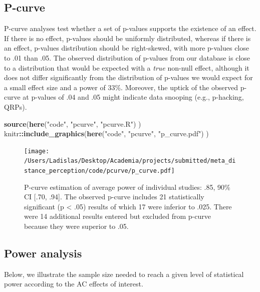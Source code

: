 \documentclass[floatsintext,doc]{apa6}
\newenvironment{Shaded}{\begin{snugshade}}{\end{snugshade}}
\newcommand{\KeywordTok}[1]{\textcolor[rgb]{0.13,0.29,0.53}{\textbf{#1}}}
\newcommand{\NormalTok}[1]{#1}
\newcommand{\OperatorTok}[1]{\textcolor[rgb]{0.81,0.36,0.00}{\textbf{#1}}}
\newcommand{\StringTok}[1]{\textcolor[rgb]{0.31,0.60,0.02}{#1}}
\begin{document}
\hypertarget{p-curve}{%
\subsection{P-curve}\label{p-curve}}

P-curve analyses test whether a set of p-values supports the existence of an effect. If there is no effect, p-values should be uniformly distributed, whereas if there is an effect, p-values distribution should be right-skewed, with more p-values close to .01 than .05. The observed distribution of p-values from our database is close to a distribution that would be expected with a \emph{true} non-null effect, although it does not differ significantly from the distribution of p-values we would expect for a small effect size and a power of 33\%. Moreover, the uptick of the observed p-curve at p-values of .04 and .05 might indicate data snooping (e.g., p-hacking, QRPs).

\begin{Shaded}
\begin{Highlighting}[]
\KeywordTok{source}\NormalTok{(}\KeywordTok{here}\NormalTok{(}\StringTok{"code"}\NormalTok{, }\StringTok{"pcurve"}\NormalTok{, }\StringTok{"pcurve.R"}\NormalTok{) )}
\NormalTok{knitr}\OperatorTok{::}\KeywordTok{include_graphics}\NormalTok{(}\KeywordTok{here}\NormalTok{(}\StringTok{"code"}\NormalTok{, }\StringTok{"pcurve"}\NormalTok{, }\StringTok{"p_curve.pdf"}\NormalTok{) )}
\end{Highlighting}
\end{Shaded}

\begin{figure}
\centering
\texttt{[image: /Users/Ladislas/Desktop/Academia/projects/submitted/meta\_distance\_perception/code/pcurve/p\_curve.pdf]}
\caption{\label{fig:pcurve}P-curve estimation of average power of individual studies: .85, 90\% CI {[}.70, .94{]}. The observed p-curve includes 21 statistically significant (p \textless{} .05) results of which 17 were inferior to .025. There were 14 additional results entered but excluded from p-curve because they were superior to .05.}
\end{figure}

\newpage

\hypertarget{power-analysis}{%
\subsection{Power analysis}\label{power-analysis}}

Below, we illustrate the sample size needed to reach a given level of statistical power according to the AC effects of interest.
\end{document}
